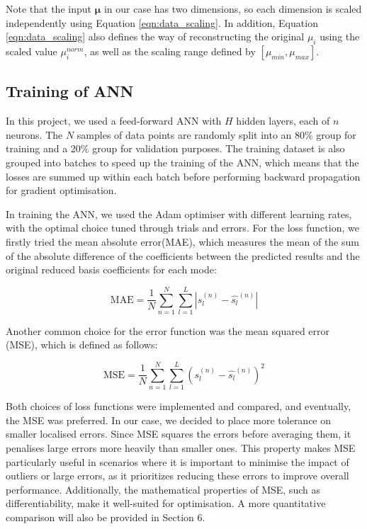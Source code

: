 Note that the input $\bm{\mu}$ in our case has two dimensions, so each dimension is scaled independently using Equation \ref{eqn:data_scaling}. In addition, Equation \ref{eqn:data_scaling} also defines the way of reconstructing the original $\mu_i$ using the scaled value $\mu^{norm}_i $, as well as the scaling range defined by $[\mu_{min}, \mu_{max}]$.

\subsection{Training of ANN}
In this project, we used a feed-forward ANN with $H$ hidden layers, each of $n$ neurons.  The $N$ samples of data points are randomly split into an 80\% group for training and a 20\% group for validation purposes. The training dataset is also grouped into batches to speed up the training of the ANN, which means that the losses are summed up within each batch before performing backward propagation for gradient optimisation.  

In training the ANN, we used the Adam optimiser with different learning rates, with the optimal choice tuned through trials and errors.  For the loss function, we firstly tried the mean absolute error(MAE), which measures the mean of the sum of the absolute difference of the coefficients between the predicted results and the original reduced basis coefficients for each mode:

\begin{equation}
    \text{MAE} = \frac{1}{N} \sum_{n=1}^{N} \sum_{l=1}^{L} | s_l^{(n)} - \hat{s_l}^{(n)}|
\end{equation}

Another common choice for the error function was the mean squared error (MSE), which is defined as follows:

\begin{equation}
    \text{MSE} = \frac{1}{N} \sum_{n=1}^{N} \sum_{l=1}^{L} \left( s_l^{(n)} - \hat{s_l}^{(n)} \right)^2
\end{equation}

Both choices of loss functions were implemented and compared, and eventually, the MSE was preferred. In our case, we decided to place more tolerance on smaller localised errors. Since MSE squares the errors before averaging them, it penalises large errors more heavily than smaller ones. This property makes MSE particularly useful in scenarios where it is important to minimise the impact of outliers or large errors, as it prioritizes reducing these errors to improve overall performance. Additionally, the mathematical properties of MSE, such as differentiability, make it well-suited for optimisation. A more quantitative comparison will also be provided in Section 6.

